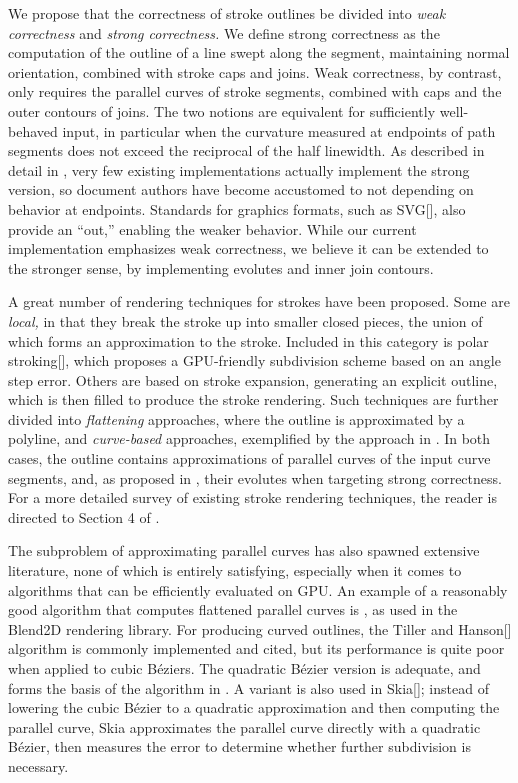 \documentclass[sigconf]{acmart}
\begin{document}
We propose that the correctness of stroke outlines be divided into \emph{weak correctness} and \emph{strong correctness.} We define strong correctness as the computation of the outline of a line swept along the segment, maintaining normal orientation, combined with stroke caps and joins. Weak correctness, by contrast, only requires the parallel curves of stroke segments, combined with caps and the outer contours of joins. The two notions are equivalent for sufficiently well-behaved input, in particular when the curvature measured at endpoints of path segments does not exceed the reciprocal of the half linewidth. As described in detail in \citet{Nehab2020}, very few existing implementations actually implement the strong version, so document authors have become accustomed to not depending on behavior at endpoints. Standards for graphics formats, such as SVG[], also provide an ``out,'' enabling the weaker behavior. While our current implementation emphasizes weak correctness, we believe it can be extended to the stronger sense, by implementing evolutes and inner join contours.

A great number of rendering techniques for strokes have been proposed. Some are \emph{local,} in that they break the stroke up into smaller closed pieces, the union of which forms an approximation to the stroke. Included in this category is polar stroking[], which proposes a GPU-friendly subdivision scheme based on an angle step error. Others are based on stroke expansion, generating an explicit outline, which is then filled to produce the stroke rendering. Such techniques are further divided into \emph{flattening} approaches, where the outline is approximated by a polyline, and \emph{curve-based} approaches, exemplified by the approach in \citet{Nehab2020}. In both cases, the outline contains approximations of parallel curves of the input curve segments, and, as proposed in \citet{Nehab2020}, their evolutes when targeting strong correctness. For a more detailed survey of existing stroke rendering techniques, the reader is directed to Section 4 of \citet{Nehab2020}.

The subproblem of approximating parallel curves has also spawned extensive literature, none of which is entirely satisfying, especially when it comes to algorithms that can be efficiently evaluated on GPU. An example of a reasonably good algorithm that computes flattened parallel curves is \citet{Yzerman2020}, as used in the Blend2D rendering library. For producing curved outlines, the Tiller and Hanson[] algorithm is commonly implemented and cited, but its performance is quite poor when applied to cubic Béziers. The quadratic Bézier version is adequate, and forms the basis of the algorithm in \citet{Nehab2020}. A variant is also used in Skia[]; instead of lowering the cubic Bézier to a quadratic approximation and then computing the parallel curve, Skia approximates the parallel curve directly with a quadratic Bézier, then measures the error to determine whether further subdivision is necessary.
\end{document}
